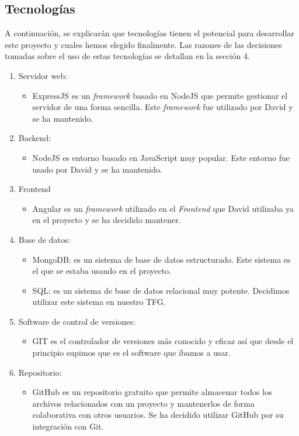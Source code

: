 \documentclass[11pt]{article}
\begin{document}
\subsection{Tecnologías}
 A continuación, se explicarán que tecnologías tienen el potencial para desarrollar este proyecto y cuales hemos elegido finalmente. Las razones de las decisiones tomadas sobre el uso de estas tecnologías se detallan en la sección 4.
\begin{enumerate} 
	\item Servidor web:
	\begin{itemize} 
		\item ExpressJS es un \textit{framework} basado en NodeJS que permite gestionar el servidor de una forma sencilla. Este \textit{framework} fue utilizado por David y se ha mantenido.
	\end{itemize}
	\item Backend: 
	\begin{itemize} 
		\item NodeJS es entorno basado en JavaScript muy popular. Este entorno fue usado por David y se ha mantenido.
	\end{itemize}
	\item Frontend
	\begin{itemize} 
		\item Angular es un \textit{framework} utilizado en el \textit{Frontend} que David utilizaba ya en el proyecto y se ha decidido mantener.
	\end{itemize}
	\item Base de datos: 
	\begin{itemize} 
		\item MongoDB: es un sistema de base de datos estructurado. Este sistema es el que se estaba usando en el proyecto.
		\item SQL: es un sistema de base de datos relacional muy potente. Decidimos utilizar este sistema en nuestro TFG.
	\end{itemize}
	\item Software de control de versiones:
	\begin{itemize} 
		\item GIT es el controlador de versiones más conocido y eficaz así que desde el principio supimos que es el software que íbamos a usar. 
	\end{itemize}
	\item Repositorio: 
	\begin{itemize} 
		\item GitHub es un repositorio gratuito que permite almacenar todos los archivos relacionados con un proyecto y mantenerlos de forma colaborativa con otros usuarios. Se ha decidido utilizar GitHub por su integración con Git.

\end{itemize}
\end{enumerate}
\end{document}
